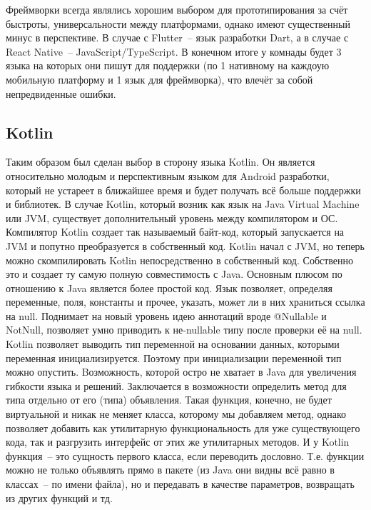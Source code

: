 Фреймворки всегда являлись хорошим выбором для прототипирования за счёт быстроты, универсальности между платформами, однако имеют существенный минус в перспективе. В случае с Flutter~-- язык разработки Dart, а в случае с React Native~-- JavaScript/TypeScript. В конечном итоге у комнады будет 3 языка на которых они пишут для поддержки (по 1 нативному на каждоую мобильную платформу и 1 язык для фреймворка), что влечёт за собой непредвиденные ошибки.

\subsection{Kotlin}
Таким образом был сделан выбор в сторону языка Kotlin. Он является относительно молодым и перспективным языком для Android разработки, который не устареет в ближайшее время и будет получать всё больше поддержки и библиотек. В случае Kotlin, который возник как язык на Java Virtual Machine или JVM, существует дополнительный уровень между компилятором и ОС. Компилятор Kotlin создает так называемый байт-код, который запускается на JVM и попутно преобразуется в собственный код. Kotlin начал с JVM, но теперь можно скомпилировать Kotlin непосредственно в собственный код. Собственно это и создает ту самую полную совместимость с Java. Основным плюсом по отношению к Java является более простой код. Язык позволяет, определяя переменные, поля, константы и прочее, указать, может ли в них храниться ссылка на null. Поднимает на новый уровень идею аннотаций вроде @Nullable и NotNull, позволяет умно приводить к не-nullable типу после проверки её на null. Kotlin позволяет выводить тип переменной на основании данных, которыми переменная инициализируется. Поэтому при инициализации переменной тип можно опустить. Bозможность, которой остро не хватает в Java для увеличения гибкости языка и решений. Заключается в возможности определить метод для типа отдельно от его (типа) объявления. Такая функция, конечно, не будет виртуальной и никак не меняет класса, которому мы добавляем метод, однако позволяет добавить как утилитарную функциональность для уже существующего кода, так и разгрузить интерфейс от этих же утилитарных методов. И у Kotlin функция~-- это сущность первого класса, если переводить дословно. Т.е. функции можно не только объявлять прямо в пакете (из Java они видны всё равно в классах~-- по имени файла), но и передавать в качестве параметров, возвращать из других функций и тд.


